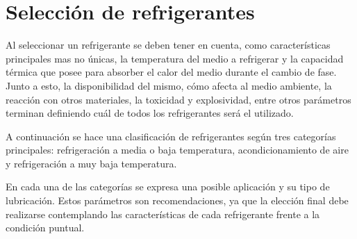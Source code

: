 

	\section{Selección de refrigerantes}

	Al seleccionar un refrigerante se deben tener en cuenta, como características principales mas no únicas, la temperatura del medio a refrigerar y la capacidad térmica que posee para absorber el calor del medio durante el cambio de fase. Junto a esto, la disponibilidad del mismo, cómo afecta al medio ambiente, la reacción con otros materiales, la toxicidad y explosividad, entre otros parámetros terminan definiendo cuál de todos los refrigerantes será el utilizado. 
	
	A continuación se hace una clasificación de refrigerantes según tres categorías principales: refrigeración a media o baja temperatura, acondicionamiento de aire y refrigeración a muy baja temperatura.

	En cada una de las categorías se expresa una posible aplicación y su tipo de lubricación. Estos parámetros son recomendaciones, ya que la elección final debe realizarse contemplando las características de cada refrigerante frente a la condición puntual.

